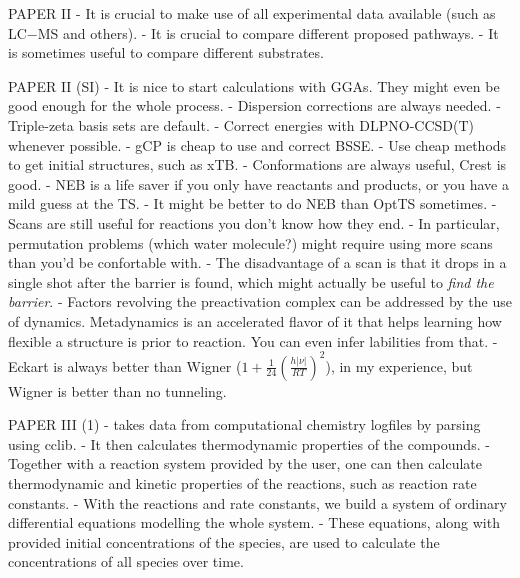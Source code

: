 PAPER II
- It is crucial to make use of all experimental data available (such as LC−MS and others).
- It is crucial to compare different proposed pathways.
- It is sometimes useful to compare different substrates.

PAPER II (SI)
- It is nice to start calculations with GGAs.
They might even be good enough for the whole process.
- Dispersion corrections are always needed.
- Triple-zeta basis sets are default.
- Correct energies with DLPNO-CCSD(T) whenever possible.
- gCP is cheap to use and correct BSSE.
- Use cheap methods to get initial structures,
such as xTB.
- Conformations are always useful,
Crest is good.
- NEB is a life saver if you only have reactants and products,
or you have a mild guess at the TS.
- It might be better to do NEB than OptTS sometimes.
- Scans are still useful for reactions you don't know how they end.
- In particular,
permutation problems (which water molecule?) might require
using more scans than you'd be confortable with.
- The disadvantage of a scan is that it drops in a single shot
after the barrier is found,
which might actually be useful
to \emph{find the barrier}.
- Factors revolving the preactivation complex can be
addressed by the use of dynamics.
Metadynamics is an accelerated flavor of it that
helps learning how flexible a structure is prior to reaction.
You can even infer labilities from that.
- Eckart is always better than
Wigner ($1 + \frac{1}{24} \left( \frac{h |\nu|}{R T} \right)^2$),
in my experience,
but Wigner is better than no tunneling.

PAPER III (1)
- \overreact{} takes data from computational chemistry logfiles by parsing using cclib.
- It then calculates thermodynamic properties of the compounds.
- Together with a reaction system provided by the user,
one can then calculate thermodynamic and kinetic properties of the reactions,
such as reaction rate constants.
- With the reactions and rate constants,
we build a system of ordinary differential equations
modelling the whole system.
- These equations,
along with provided initial concentrations of the species,
are used to calculate the concentrations of all species over time.

